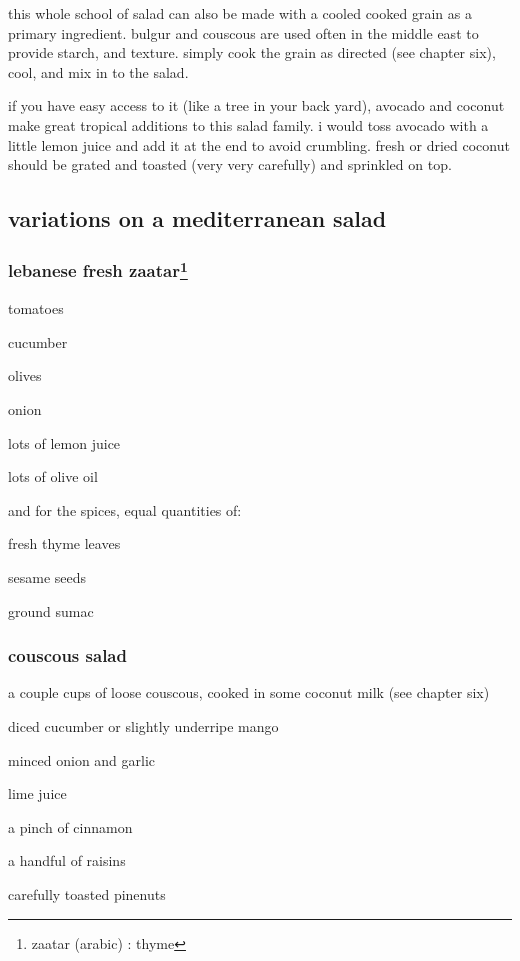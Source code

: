this whole school of salad can also be made with a cooled cooked grain as a 
primary ingredient. bulgur and couscous are used often in the middle east to 
provide starch, and texture. simply cook the grain as directed (see chapter 
six), cool, and mix in to the salad.

if you have easy access to it (like a tree in your back yard), avocado and 
coconut make great tropical additions to this salad family. i would toss 
avocado with a little lemon juice and add it at the end to avoid crumbling. 
fresh or dried coconut should be grated and toasted (very very carefully) and 
sprinkled on top.

\subsection{variations on a mediterranean salad}

\subsubsection{lebanese fresh zaatar\footnote{zaatar (arabic) : thyme}}

\begin{ingredients}
  \item tomatoes
  \item cucumber
  \item olives
  \item onion
  \item lots of lemon juice
  \item lots of olive oil
\end{ingredients}


	and for the spices,
equal quantities of:

\begin{ingredients}
  \item fresh thyme leaves
  \item sesame seeds
  \item ground sumac
\end{ingredients}

\subsubsection{couscous salad}

\begin{ingredients}
  \item a couple cups of loose couscous, cooked in some coconut milk (see chapter six)
  \item diced cucumber or slightly underripe mango
  \item minced onion and garlic
  \item lime juice
  \item a pinch of cinnamon
  \item a handful of raisins
  \item carefully toasted pinenuts
\end{ingredients}

